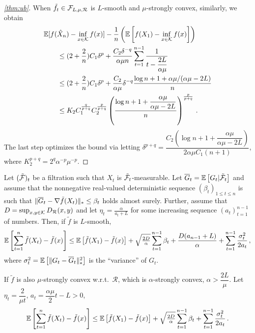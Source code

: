 \begin{proof}[\cref{thm:ub}]
 When $\tilde{f}_t \in \mathcal{F}_{L,\mu, \mathcal{R}}$ is $L$-smooth and $\mu$-strongly convex, similarly, we obtain
 \begin{align*}
 \MoveEqLeft
 \E[f(\hat X_n) - \inf_{x \in \cK} f(x)] -\dfrac{1}{n}\left(\EE{f(X_1)-\inf_{x \in \cK}f(x)}\right)\\
&\le (2+\dfrac{2}{n})C_1\delta^p+\dfrac{C_2 \delta^{-q}}{\alpha \mu n} \sum_{t=1}^{n-1}\dfrac{1}{t-\dfrac{2L}{\alpha \mu}}\\
&\le (2+\dfrac{2}{n})C_1\delta^p+\dfrac{C_2 }{\alpha \mu}\delta^{-q} \dfrac{\log n+1+\alpha \mu/(\alpha \mu-2L)}{n}\\
&\le K_2C_1^{\frac{q}{p+q}}C_2^{\frac{p}{p+q}} \left( \frac{\log n+1+\dfrac{\alpha \mu}{\alpha \mu -2L}}{n} \right)^{\frac{p}{p+q}}\,.
 \end{align*}
The last step optimizes the bound via letting
$\delta^{p+q} =  \dfrac{C_2\left( \log n+1+\dfrac{\alpha \mu}{\alpha \mu -2L}\right)}{2\alpha \mu C_1 (n+1)}$,
where
$K_2^{p+q}=2^{q}\alpha^{-p}\mu^{-p}$.
\end{proof}

\begin{lemma}
\label{lem:ub}
Let $({\tilde{\mathcal{F}}})_{t}$ be a filtration such that $X_t$ is ${\tilde{\mathcal{F}}}_t$-measurable.
Let $\overline G_t = \mathbb{E}\left[G_t|{\tilde{\mathcal{F}}}_t\right]$
and assume that the nonnegative real-valued deterministic sequence $(\beta_t)_{1\le t\le n}$ is such that
$\|\overline G_t - \nabla \tilde{f}(X_t)\|_* \le \beta_t$ holds almost surely.
Further, assume that $D=\sup_{x,y\in \mathcal{K}} D_{\mathcal{R}}(x,y)$ and let $\eta_t = \frac{\alpha}{a_t+L}$ for some increasing
sequence $(a_t)_{t=1}^{n-1}$ of numbers. Then, if $\tilde{f}$ is $L$-smooth,
\begin{align*}
\mathbb{E}\left[ \sum_{t=1}^n \tilde{f}(X_t) - \tilde{f}(x) \right]
\le 	 \mathbb{E}\left[\tilde{f}(X_1)-\tilde{f}(x)\right]+
  \sqrt{\tfrac{2D}{\alpha}} \sum_{t=1}^{n-1} \beta_t
 +\frac{D(a_{n-1}+L)}{\alpha} +
	  \sum_{t=1}^{n-1}\frac{\sigma_t^2}{2a_t}\,,
\end{align*}
where $\sigma_t^2 = \mathbb{E}\left[ \|G_t-\overline G_t\|_*^2\right]$ is the ``variance'' of $G_t$.

If ${\tilde{f}}$ is also $\mu$-strongly convex w.r.t.\  $\mathcal{R}$, which is $\alpha$-strongly convex, $\alpha > \dfrac{2L}{\mu}$. Let $\eta_t = \dfrac{2}{\mu t}$, $a_t = \dfrac{\alpha \mu}{2}t-L > 0$,
\begin{align*}
 \mathbb{E}\left[ \sum_{t=1}^n \tilde{f}(X_t) - \tilde{f}(x) \right]
\le 	 \mathbb{E}\left[\tilde{f}(X_1)-\tilde{f}(x)\right]+
 \sqrt{\tfrac{2D}{\alpha}} \sum_{t=1}^{n-1} \beta_t
 +\sum_{t=1}^{n-1}\frac{\sigma_t^2}{2a_t}\,.
\end{align*}
\end{lemma}



